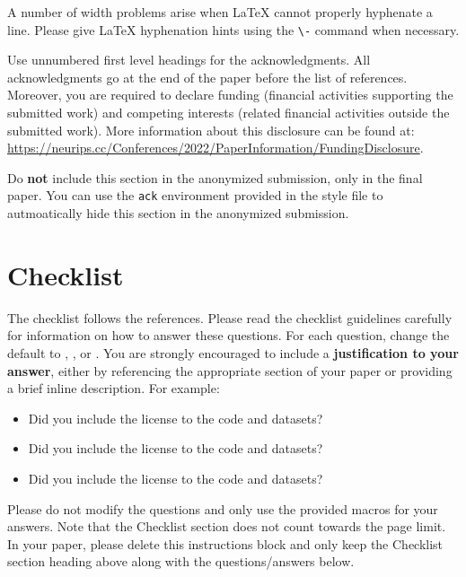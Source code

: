 \documentclass{article}
\begin{document}
A number of width problems arise when \LaTeX{} cannot properly hyphenate a
line. Please give LaTeX hyphenation hints using the \verb+\-+ command when
necessary.

\begin{ack}
Use unnumbered first level headings for the acknowledgments. All acknowledgments
go at the end of the paper before the list of references. Moreover, you are required to declare
funding (financial activities supporting the submitted work) and competing interests (related financial activities outside the submitted work).
More information about this disclosure can be found at: \url{https://neurips.cc/Conferences/2022/PaperInformation/FundingDisclosure}.


Do {\bf not} include this section in the anonymized submission, only in the final paper. You can use the \texttt{ack} environment provided in the style file to autmoatically hide this section in the anonymized submission.
\end{ack}







\section*{Checklist}


The checklist follows the references.  Please
read the checklist guidelines carefully for information on how to answer these
questions.  For each question, change the default \answerTODO{} to \answerYes{},
\answerNo{}, or \answerNA{}.  You are strongly encouraged to include a {\bf
justification to your answer}, either by referencing the appropriate section of
your paper or providing a brief inline description.  For example:
\begin{itemize}
  \item Did you include the license to the code and datasets? 
  \item Did you include the license to the code and datasets? 
  \item Did you include the license to the code and datasets? \answerNA{}
\end{itemize}
Please do not modify the questions and only use the provided macros for your
answers.  Note that the Checklist section does not count towards the page
limit.  In your paper, please delete this instructions block and only keep the
Checklist section heading above along with the questions/answers below.
\end{document}
